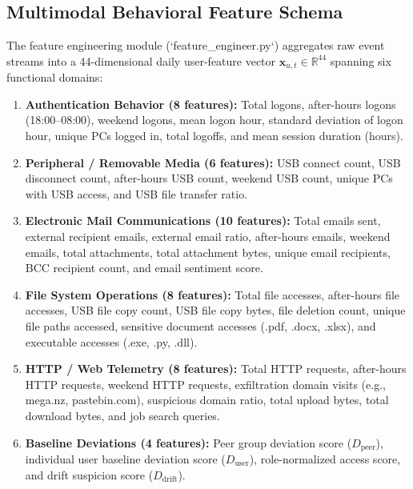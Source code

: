 \documentclass[12pt,a4paper]{report}
\begin{document}
\subsection{Multimodal Behavioral Feature Schema}
The feature engineering module (`feature_engineer.py`) aggregates raw event streams into a 44-dimensional daily user-feature vector $\mathbf{x}_{u,t} \in \mathbb{R}^{44}$ spanning six functional domains:
\begin{enumerate}
    \item \textbf{Authentication Behavior (8 features):} Total logons, after-hours logons (18:00--08:00), weekend logons, mean logon hour, standard deviation of logon hour, unique PCs logged in, total logoffs, and mean session duration (hours).
    \item \textbf{Peripheral / Removable Media (6 features):} USB connect count, USB disconnect count, after-hours USB count, weekend USB count, unique PCs with USB access, and USB file transfer ratio.
    \item \textbf{Electronic Mail Communications (10 features):} Total emails sent, external recipient emails, external email ratio, after-hours emails, weekend emails, total attachments, total attachment bytes, unique email recipients, BCC recipient count, and email sentiment score.
    \item \textbf{File System Operations (8 features):} Total file accesses, after-hours file accesses, USB file copy count, USB file copy bytes, file deletion count, unique file paths accessed, sensitive document accesses (.pdf, .docx, .xlsx), and executable accesses (.exe, .py, .dll).
    \item \textbf{HTTP / Web Telemetry (8 features):} Total HTTP requests, after-hours HTTP requests, weekend HTTP requests, exfiltration domain visits (e.g., mega.nz, pastebin.com), suspicious domain ratio, total upload bytes, total download bytes, and job search queries.
    \item \textbf{Baseline Deviations (4 features):} Peer group deviation score ($D_{\text{peer}}$), individual user baseline deviation score ($D_{\text{user}}$), role-normalized access score, and drift suspicion score ($D_{\text{drift}}$).
\end{enumerate}
\end{document}

